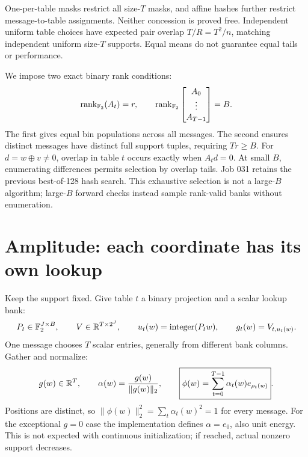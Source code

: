 \documentclass[11pt]{article}
\begin{document}
One-per-table masks restrict all size-$T$ masks, and affine hashes further restrict message-to-table assignments.
Neither concession is proved free. Independent uniform table choices have expected pair overlap $T/R=T^2/n$,
matching independent uniform size-$T$ supports. Equal means do not guarantee equal tails or performance.

We impose two exact binary rank conditions:
\[
 \operatorname{rank}_{\mathbb{F}_2}(A_t)=r,\qquad
 \operatorname{rank}_{\mathbb{F}_2}\begin{bmatrix}A_0\\\vdots\\A_{T-1}\end{bmatrix}=B.
\]
The first gives equal bin populations across all messages. The second ensures distinct messages have distinct full
support tuples, requiring $Tr\ge B$. For $d=w\oplus v\ne0$, overlap in table $t$ occurs exactly when $A_td=0$.
At small $B$, enumerating differences permits selection by overlap tails. Job 031 retains the previous best-of-128
hash search. This exhaustive selection is not a large-$B$ algorithm; large-$B$ forward checks instead sample
rank-valid banks without enumeration.


\section{Amplitude: each coordinate has its own lookup}

Keep the support fixed. Give table $t$ a binary projection and a scalar lookup bank:
\[
 P_t\in\mathbb{F}_2^{J\times B},\qquad V\in\mathbb{R}^{T\times2^J},\qquad
 u_t(w)=\operatorname{integer}(P_tw),\qquad g_t(w)=V_{t,u_t(w)}.
\]
One message chooses $T$ scalar entries, generally from different bank columns. Gather and normalize:
\[
 g(w)\in\mathbb{R}^T,\qquad \alpha(w)=\frac{g(w)}{\|g(w)\|_2},\qquad
 \boxed{\phi(w)=\sum_{t=0}^{T-1}\alpha_t(w)e_{\rho_t(w)}}.
\]
Positions are distinct, so $\|\phi(w)\|_2^2=\sum_t\alpha_t(w)^2=1$ for every message.
For the exceptional $g=0$ case the implementation defines $\alpha=e_0$, also unit energy. This is not expected
with continuous initialization; if reached, actual nonzero support decreases.
\end{document}
